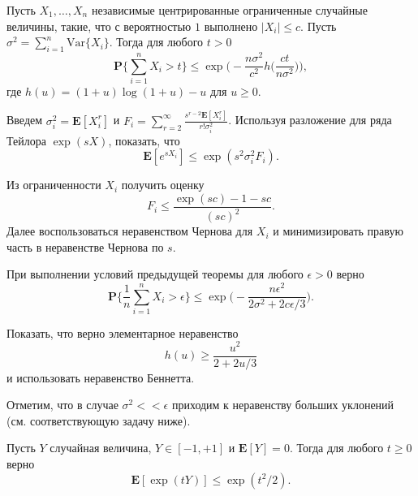 \begin{problem}
Пусть $X_1,\dots, X_n$ независимые центрированные ограниченные случайные величины, такие, что с вероятностью $1$ выполнено $|X_i|\leq c$.
Пусть $\sigma^2 = \sum_{i=1}^n\text{Var}\{X_i\}$.
 Тогда для любого $t>0$ 
\begin{equation*}
\mathbf{P}\bigg\{\sum_{i=1}^n X_i>t\biggr\}\leq \exp\bigg(-\frac{n\sigma^2}{c^2}h\bigg(\frac{ct}{n\sigma^2}\biggr)\biggr),
\end{equation*}
где $h(u) = (1+u)\log(1+u)-u$ для $u\geq 0$.
\end{problem}
\begin{remark}
Введем $\sigma_i^2 = \mathbf{E}[X_i^r]$ и $F_i = \sum_{r=2}^{\infty}\frac{s^{r-2}\mathbf{E}[X_i^r]}{r!\sigma_i^2}$.
Используя разложение для ряда Тейлора $\exp(sX)$, показать, что 
\begin{equation*}
\mathbf{E}[e^{sX_i}]\leq \exp(s^2\sigma^2_iF_i).
\end{equation*}

Из ограниченности  $X_i$ получить оценку
\begin{equation*}
F_i\leq \frac{\exp(sc)-1-sc}{(sc)^2}.
\end{equation*} 
Далее воспользоваться неравенством Чернова для $X_i$ и минимизировать правую часть в неравенстве Чернова по $s$.
\end{remark}

\begin{problem}
При выполнении условий предыдущей теоремы для любого  $\epsilon>0$ верно 
\begin{equation*}
\mathbf{P}\bigg\{\frac{1}{n}\sum_{i=1}^n X_i>\epsilon\biggr\}\leq \exp\bigg(-\frac{n\epsilon^2}{2\sigma^2+2c\epsilon/3}\biggr).
\end{equation*}
\end{problem}

\begin{remark} 
Показать, что верно элементарное неравенство 
\begin{equation*}
h(u)\geq \frac{u^2}{2+2u/3}
\end{equation*}
и использовать неравенство Беннетта.

Отметим, что в случае $\sigma^2<< \epsilon$ приходим к неравенству больших уклонений (см. соответствующую задачу ниже).
\end{remark}

\begin{problem} Пусть $Y$ случайная величина,  $Y\in [-1,+1]$ и $\mathbf{E}[Y]=0$. Тогда для любого $t\geq 0$ верно 
\begin{equation*}
\mathbf{E}[\exp(tY)]\leq \exp(t^2/2).
\end{equation*}
\end{problem}

